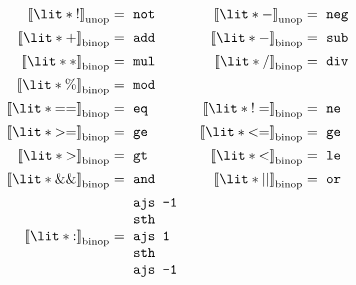 \documentclass[10pt]{article} %
\makeatletter
\theoremstyle{definitionstyle}
\theoremstyle{lemmastyle}
\newenvironment{asmcode}{%
\begin{tabular}{%
>{\ttfamily}l>{\ttfamily}l}%
}{%
\end{tabular}%
}
\newcommand{\compile}[3]{{[\![ #3 ]\!]}^{#1}_{\text{\normalfont #2}}}
\newenvironment{Block}[1]{%
\begin{Warning}[singleextra={\path let \p1=(P), \p2=(O) in ($(\x2,0)+0.5*(0,\y1)$) node[mdframeleftlinetitle] {#1};}]%
}{%
\end{Warning}%
}
\makeatother
\begin{document}
\begin{Block}{Operations}

\begin{align*}
  \compile{}{unop}{\lit*{!}} = & \begin{asmcode}not\end{asmcode}
& \compile{}{unop}{\lit*{-}} = & \begin{asmcode}neg\end{asmcode}
%
\\\compile{}{binop}{\lit*{+}} = & \begin{asmcode}add\end{asmcode}
& \compile{}{binop}{\lit*{-}} = & \begin{asmcode}sub\end{asmcode}
\\\compile{}{binop}{\lit*{*}} = & \begin{asmcode}mul\end{asmcode}
& \compile{}{binop}{\lit*{/}} = & \begin{asmcode}div\end{asmcode}
\\\compile{}{binop}{\lit*{\%}} = & \begin{asmcode}mod\end{asmcode}
%
\\\compile{}{binop}{\lit*{==}} = & \begin{asmcode}eq\end{asmcode}
& \compile{}{binop}{\lit*{!=}} = & \begin{asmcode}ne\end{asmcode}
%
\\\compile{}{binop}{\lit*{>=}} = & \begin{asmcode}ge\end{asmcode}
& \compile{}{binop}{\lit*{<=}} = & \begin{asmcode}ge\end{asmcode}
\\\compile{}{binop}{\lit*{>}} = & \begin{asmcode}gt\end{asmcode}
& \compile{}{binop}{\lit*{<}} = & \begin{asmcode}le\end{asmcode}
%
\\\compile{}{binop}{\lit*{\&\&}} = & \begin{asmcode}and\end{asmcode}
& \compile{}{binop}{\lit*{||}} = & \begin{asmcode}or\end{asmcode}
%
\\\compile{}{binop}{\lit*{:}} = & \begin{asmcode}
ajs -1 \\
sth \\
ajs 1 \\
sth \\
ajs -1
\end{asmcode}
\end{align*}

\end{Block}
\end{document}

